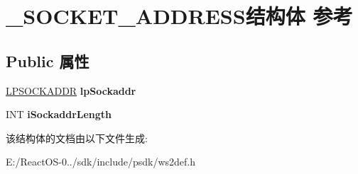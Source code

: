 \hypertarget{struct___s_o_c_k_e_t___a_d_d_r_e_s_s}{}\section{\+\_\+\+S\+O\+C\+K\+E\+T\+\_\+\+A\+D\+D\+R\+E\+S\+S结构体 参考}
\label{struct___s_o_c_k_e_t___a_d_d_r_e_s_s}
\subsection*{Public 属性}
\begin{DoxyCompactItemize}
\item 
\mbox{\label{struct___s_o_c_k_e_t___a_d_d_r_e_s_s_a7a4e84378db4c66c81c3fccad7de49e1}} 
\hyperlink{structsockaddr}{L\+P\+S\+O\+C\+K\+A\+D\+DR} {\bfseries lp\+Sockaddr}
\item 
\mbox{\label{struct___s_o_c_k_e_t___a_d_d_r_e_s_s_a8d0d50fc01046ae971714d9567f6ef92}} 
I\+NT {\bfseries i\+Sockaddr\+Length}
\end{DoxyCompactItemize}


该结构体的文档由以下文件生成\+:\begin{DoxyCompactItemize}
\item 
E\+:/\+React\+O\+S-\/0../sdk/include/psdk/ws2def.\+h\end{DoxyCompactItemize}
